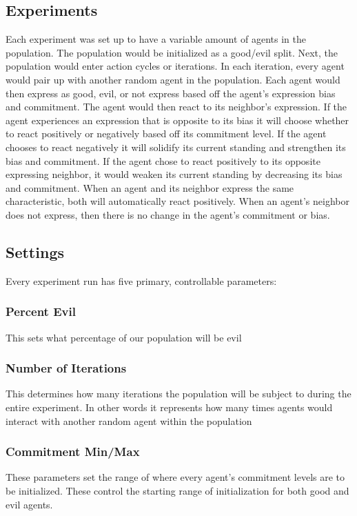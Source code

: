 \documentclass[]{article}
\begin{document}
\subsection{Experiments}
Each experiment was set up to have a variable amount of agents in the population. The population would be initialized as a good/evil split. Next, the population would enter action cycles or iterations. In each iteration, every agent would pair up with another random agent in the population. Each agent would then express as good, evil, or not express based off the agent's expression bias and commitment. The agent would then react to its neighbor's expression. If the agent experiences an expression that is opposite to its bias it will choose whether to react positively or negatively based off its commitment level. If the agent chooses to react negatively it will solidify its current standing and strengthen its bias and commitment. If the agent chose to react positively to its opposite expressing neighbor, it would weaken its current standing by decreasing its bias and commitment. When an agent and its neighbor express the same characteristic, both will automatically react positively. When an agent's neighbor does not express, then there is no change in the agent's commitment or bias.

\subsection{Settings}
Every experiment run has five primary, controllable parameters:

\subsubsection{Percent Evil}
This sets what percentage of our population will be evil
\subsubsection{Number of Iterations}
This determines how many iterations the population will be subject to during the entire experiment. In other words it represents how many times agents would interact with another random agent within the population 
\subsubsection{Commitment Min/Max}
These parameters set the range of where every agent's commitment levels are to be initialized. These control the starting range of initialization for both good and evil agents.
\end{document}

